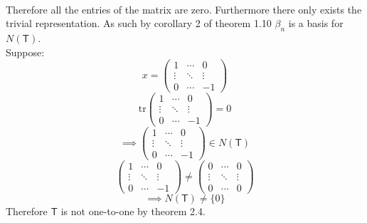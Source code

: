 \begin{enumerate}[(a)]
\\
Therefore all the entries of the matrix are zero. Furthermore there
only exists the trivial representation. As such by corollary 2 of
theorem 1.10 $\beta_n$ is a basis for $N(\mathsf{T})$.
\\Suppose: \[x =\begin{pmatrix}
1&\cdots&0\\
 \vdots&\ddots&\vdots\\
0&\cdots&-1
\end{pmatrix} \]
\begin{equation}
\text{tr}\begin{pmatrix}
1&\cdots&0\\
 \vdots&\ddots&\vdots\\
0&\cdots&-1
\end{pmatrix}=0
\end{equation}
\begin{equation}
\implies \begin{pmatrix}
1&\cdots&0\\
 \vdots&\ddots&\vdots\\
0&\cdots&-1
\end{pmatrix} \in N(\mathsf{T})
\end{equation}
\begin{equation}
\begin{pmatrix}
1&\cdots&0\\
 \vdots&\ddots&\vdots\\
0&\cdots&-1
\end{pmatrix} \neq 
\begin{pmatrix}
0&\cdots&0\\
 \vdots&\ddots&\vdots\\
0&\cdots&0
\end{pmatrix}
\end{equation}
\begin{equation}
\implies N(\mathsf{T}) \neq \{0\}
\end{equation}
Therefore $\mathsf{T}$ is not one-to-one by theorem 2.4.
\end{enumerate}
